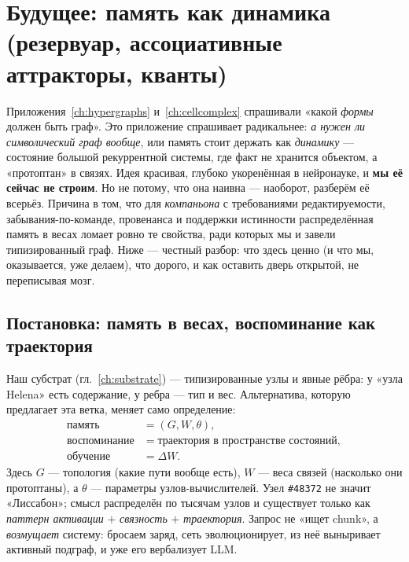 \chapter{Будущее: память как динамика (резервуар, ассоциативные аттракторы, кванты)}
\label{ch:dynamical}

\begin{pitfall}
Приложения~\ref{ch:hypergraphs} и~\ref{ch:cellcomplex} спрашивали «какой \emph{формы} должен
быть граф». Это приложение спрашивает радикальнее: \emph{а нужен ли символический граф
вообще}, или память стоит держать как \emph{динамику} — состояние большой рекуррентной
системы, где факт не хранится объектом, а «протоптан» в связях. Идея красивая, глубоко
укоренённая в нейронауке, и \textbf{мы её сейчас не строим}. Но не потому, что она наивна —
наоборот, разберём её всерьёз. Причина в том, что для \emph{компаньона} с требованиями
редактируемости, забывания-по-команде, провенанса и поддержки истинности распределённая
память в весах ломает ровно те свойства, ради которых мы и завели типизированный граф. Ниже
— честный разбор: что здесь ценно (и что мы, оказывается, уже делаем), что дорого, и как
оставить дверь открытой, не переписывая мозг.
\end{pitfall}

\section{Постановка: память в весах, воспоминание как траектория}

Наш субстрат (гл.~\ref{ch:substrate}) — типизированные узлы и явные рёбра: у «узла Helena»
есть содержание, у ребра — тип и вес. Альтернатива, которую предлагает эта ветка, меняет
само определение:
\[
\begin{aligned}
\text{память} &= (G, W, \theta),\\
\text{воспоминание} &= \text{траектория в пространстве состояний},\\
\text{обучение} &= \Delta W .
\end{aligned}
\]
Здесь $G$ — топология (какие пути вообще есть), $W$ — веса связей (насколько они
протоптаны), а $\theta$ — параметры узлов-вычислителей. Узел \texttt{\#48372} не значит
«Лиссабон»; смысл распределён по тысячам узлов и существует только как \emph{паттерн
активации} $+$ \emph{связность} $+$ \emph{траектория}. Запрос не «ищет chunk», а
\emph{возмущает} систему: бросаем заряд, сеть эволюционирует, из неё выныривает активный
подграф, и уже его вербализует LLM.


